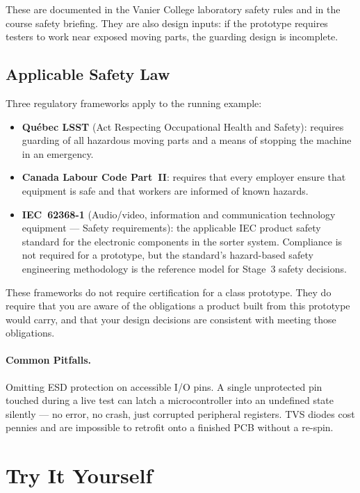 These are documented in the Vanier College laboratory safety rules and in the
course safety briefing.
They are also design inputs: if the prototype requires testers to work near
exposed moving parts, the guarding design is incomplete.

\subsection{Applicable Safety Law}
\label{sec:ch9-absorbed-law}

Three regulatory frameworks apply to the running example:
\begin{itemize}
  \item \textbf{Qu\'{e}bec LSST} (Act Respecting Occupational Health and Safety):
        requires guarding of all hazardous moving parts and a means of stopping
        the machine in an emergency.
  \item \textbf{Canada Labour Code Part~II}: requires that every employer ensure
        that equipment is safe and that workers are informed of known hazards.
  \item \textbf{IEC~62368-1} (Audio/video, information and communication
        technology equipment --- Safety requirements): the applicable IEC product
        safety standard for the electronic components in the sorter system.
        Compliance is not required for a prototype, but the standard's hazard-based
        safety engineering methodology is the reference model for Stage~3 safety
        decisions.
\end{itemize}

These frameworks do not require certification for a class prototype.
They do require that you are aware of the obligations a product built from this
prototype would carry, and that your design decisions are consistent with meeting
those obligations.

\paragraph{Common Pitfalls.}
Omitting ESD protection on accessible I/O pins.
A single unprotected pin touched during a live test can latch a microcontroller
into an undefined state silently --- no error, no crash, just corrupted peripheral
registers.
TVS diodes cost pennies and are impossible to retrofit onto a finished PCB without
a re-spin.

\section{Try It Yourself}
\label{sec:ch9-tiy}


